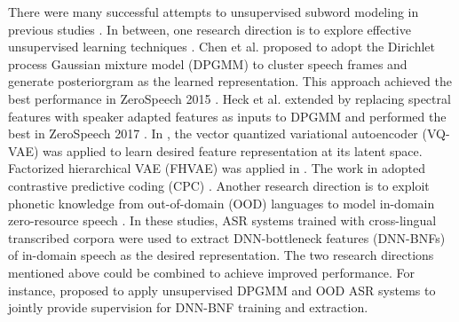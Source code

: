 \documentclass[a4paper]{article}
\begin{document}

There were many successful attempts to unsupervised subword modeling in previous studies \cite{chen2015parallel,heck2017feature,chorowski2019unsupervised,shibata2017composite,feng2019_TASLP,riviere2020unsupervised,Feng2019combining}. In between, one research direction is to explore effective unsupervised learning techniques 
\cite{chen2015parallel,heck2017feature,chorowski2019unsupervised}. Chen et al. \cite{chen2015parallel} proposed to adopt the Dirichlet process Gaussian mixture model (DPGMM) to cluster speech frames and generate posteriorgram as the learned  representation. This approach achieved the best performance in ZeroSpeech 2015 \cite{versteegh2015zero}. Heck et al. \cite{heck2017feature} extended \cite{chen2015parallel} by replacing spectral features with speaker adapted features as inputs to DPGMM and performed the best in ZeroSpeech 2017 \cite{heck2017feature}. 
In  \cite{chorowski2019unsupervised}, the vector quantized variational autoencoder (VQ-VAE) \cite{oord2017neural} was applied to learn desired feature representation at its latent space. Factorized hierarchical VAE (FHVAE) was applied in \cite{Feng2019improving}. 
The work in \cite{riviere2020unsupervised} adopted contrastive predictive coding (CPC) \cite{oord2018cpc}.
Another research direction is to exploit phonetic knowledge from out-of-domain (OOD) languages to model  in-domain zero-resource speech \cite{feng2019_TASLP,shibata2017composite}. In these studies, ASR systems trained with cross-lingual transcribed  corpora were used to extract  DNN-bottleneck features (DNN-BNFs) of in-domain speech as the desired representation.
The two research directions mentioned above could   be combined to  achieve improved performance. For instance, \cite{feng2019_TASLP} proposed 
to apply  unsupervised DPGMM  and OOD ASR systems to jointly provide supervision for DNN-BNF training and extraction. 
\end{document}

